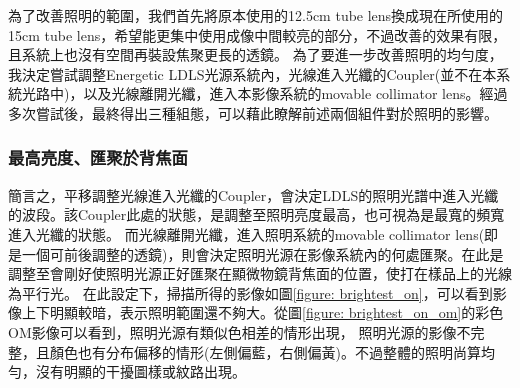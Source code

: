 \documentclass[12pt]{article}
\begin{document}
為了改善照明的範圍，我們首先將原本使用的12.5cm tube lens換成現在所使用的15cm tube lens，希望能更集中使用成像中間較亮的部分，不過改善的效果有限，且系統上也沒有空間再裝設焦聚更長的透鏡。
為了要進一步改善照明的均勻度，我決定嘗試調整Energetic LDLS光源系統內，光線進入光纖的Coupler(並不在本系統光路中)，以及光線離開光纖，進入本影像系統的movable collimator lens。經過多次嘗試後，最終得出三種組態，可以藉此瞭解前述兩個組件對於照明的影響。
\subsubsection{最高亮度、匯聚於背焦面} \label{section: illuOriginal}
簡言之，平移調整光線進入光纖的Coupler，會決定LDLS的照明光譜中進入光纖的波段。該Coupler此處的狀態，是調整至照明亮度最高，也可視為是最寬的頻寬進入光纖的狀態。
而光線離開光纖，進入照明系統的movable collimator lens(即是一個可前後調整的透鏡)，則會決定照明光源在影像系統內的何處匯聚。在此是調整至會剛好使照明光源正好匯聚在顯微物鏡背焦面的位置，使打在樣品上的光線為平行光。
在此設定下，掃描所得的影像如圖\ref{figure: brightest_on}，可以看到影像上下明顯較暗，表示照明範圍還不夠大。從圖\ref{figure: brightest_on_om}的彩色OM影像可以看到，照明光源有類似色相差的情形出現，
照明光源的影像不完整，且顏色也有分布偏移的情形(左側偏藍，右側偏黃)。不過整體的照明尚算均勻，沒有明顯的干擾圖樣或紋路出現。
\end{document}
